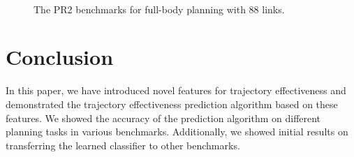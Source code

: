\documentclass[letterpaper, 10 pt, conference]{ieeeconf}  %
\begin{document}
\begin{figure}[t]
\centering
{} \qquad
{} \\
 \qquad
{} \qquad
{}
\caption{The PR2 benchmarks for full-body planning with 88 links.}
\label{fig:benchmarks3}
\end{figure}




\section{Conclusion}
In this paper, we have introduced novel features for trajectory effectiveness and demonstrated the trajectory effectiveness prediction algorithm based on these features. We showed the accuracy of the prediction algorithm on different planning tasks in various benchmarks. Additionally, we showed initial results on transferring the learned classifier to other benchmarks.
\end{document}
